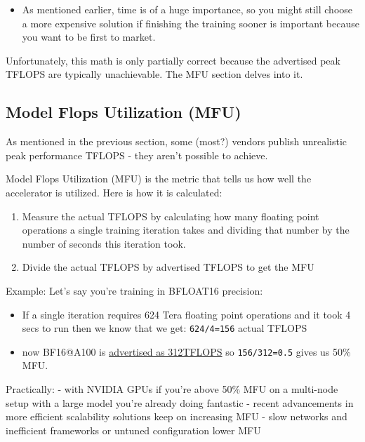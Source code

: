 \documentclass[
]{report}
\providecommand{\tightlist}{%
  \setlength{\itemsep}{0pt}\setlength{\parskip}{0pt}}\usepackage{longtable,booktabs,array}
\begin{document}
\begin{itemize}
\tightlist
\item
  As mentioned earlier, time is of a huge importance, so you might still
  choose a more expensive solution if finishing the training sooner is
  important because you want to be first to market.
\end{itemize}

Unfortunately, this math is only partially correct because the
advertised peak TFLOPS are typically unachievable. The MFU section
delves into it.

\subsection{Model Flops Utilization
(MFU)}\label{model-flops-utilization-mfu}

As mentioned in the previous section, some (most?) vendors publish
unrealistic peak performance TFLOPS - they aren't possible to achieve.

Model Flops Utilization (MFU) is the metric that tells us how well the
accelerator is utilized. Here is how it is calculated:

\begin{enumerate}
\def\labelenumi{\arabic{enumi}.}
\tightlist
\item
  Measure the actual TFLOPS by calculating how many floating point
  operations a single training iteration takes and dividing that number
  by the number of seconds this iteration took.
\item
  Divide the actual TFLOPS by advertised TFLOPS to get the MFU
\end{enumerate}

Example: Let's say you're training in BFLOAT16 precision:

\begin{itemize}
\tightlist
\item
  If a single iteration requires 624 Tera floating point operations and
  it took 4 secs to run then we know that we get: \texttt{624/4=156}
  actual TFLOPS
\item
  now BF16@A100 is
  \href{https://www.nvidia.com/en-us/data-center/a100/}{advertised as
  312TFLOPS} so \texttt{156/312=0.5} gives us 50\% MFU.
\end{itemize}

Practically: - with NVIDIA GPUs if you're above 50\% MFU on a multi-node
setup with a large model you're already doing fantastic - recent
advancements in more efficient scalability solutions keep on increasing
MFU - slow networks and inefficient frameworks or untuned configuration
lower MFU
\end{document}

